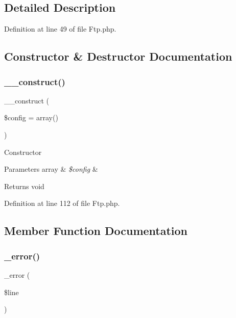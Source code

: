 \subsection{Detailed Description}


Definition at line 49 of file Ftp.\+php.



\subsection{Constructor \& Destructor Documentation}
\mbox{\label{class_c_i___f_t_p_af7f9493844d2d66e924e3c1df51ce616}} 
\subsubsection{\texorpdfstring{\_\_construct()}{\_\_construct()}}
{\footnotesize\ttfamily \+\_\+\+\_\+construct (\begin{DoxyParamCaption}\item[{}]{\$config = {\ttfamily array()} }\end{DoxyParamCaption})}

Constructor


\begin{DoxyParams}[1]{Parameters}
array & {\em \$config} & \\
\hline
\end{DoxyParams}
\begin{DoxyReturn}{Returns}
void 
\end{DoxyReturn}


Definition at line 112 of file Ftp.\+php.



\subsection{Member Function Documentation}
\mbox{\label{class_c_i___f_t_p_ac618e7d56614851d2c54aa096e1bcace}} 
\subsubsection{\texorpdfstring{\_error()}{\_error()}}
{\footnotesize\ttfamily \+\_\+error (\begin{DoxyParamCaption}\item[{}]{\$line }\end{DoxyParamCaption})\hspace{0.3cm}{\ttfamily [protected]}}

